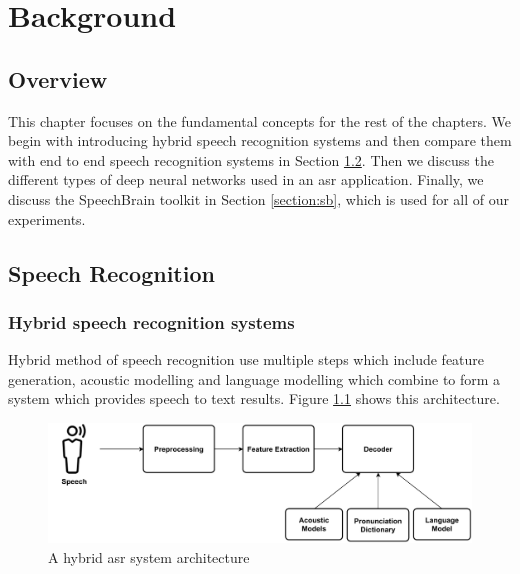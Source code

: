 \chapter{Background}
\label{chapter:background} 

\section{Overview}
This chapter focuses on the fundamental concepts for the rest of the chapters. We begin with introducing hybrid speech recognition systems and then compare them with end to end speech recognition systems in Section \ref{section:asr}. Then we discuss the different types of deep neural networks used in an \acrshort{asr} application. Finally, we discuss the SpeechBrain toolkit in Section \ref{section:sb}, which is used for all of our experiments.

\section{Speech Recognition}
\label{section:asr}

\subsection{Hybrid speech recognition systems}
\label{section:hybridasr}
Hybrid method of speech recognition use multiple steps which include feature generation, acoustic modelling and language modelling which combine to form a system which provides speech to text results. Figure \ref{fig:hyrid_asr_model} shows this architecture.

\begin{figure}[ht]
  \begin{center}
    \includegraphics[width=\textwidth]{images/Hybrid ASR System.pdf} 
    \caption{A hybrid \acrshort{asr} system architecture}
    \label{fig:hyrid_asr_model}
  \end{center}
\end{figure}


